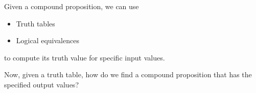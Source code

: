 
Given a compound proposition, we can use
\begin{itemize}
\item Truth tables
\item Logical equivalences
\end{itemize}
to compute its truth value for specific input values.

Now, given a truth table, how do we find a compound proposition that has the specified output values?
